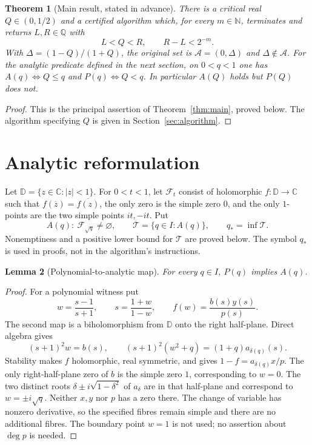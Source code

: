\documentclass[11pt,a4paper]{article}
\newtheorem{theorem}{Theorem}[section]
\newtheorem{lemma}[theorem]{Lemma}
\theoremstyle{definition}\newtheorem{definition}[theorem]{Definition}
\theoremstyle{remark}\newtheorem{remark}[theorem]{Remark}
\newcommand{\D}{\mathbb D}\newcommand{\R}{\mathbb R}
\newcommand{\C}{\mathbb C}\newcommand{\Qrat}{\mathbb Q}
\newcommand{\Adm}{\mathcal A}\newcommand{\F}{\mathcal F}
\newcommand{\T}{\mathcal T}\newcommand{\Kc}{\mathcal K}
\begin{document}
\begin{theorem}[Main result, stated in advance]\label{thm:front}
There is a critical real $Q\in(0,1/2)$ and a certified algorithm which, for every
$m\in\mathbb N$, terminates and returns $L,R\in\Qrat$ with
\[
 L<Q<R,\qquad R-L<2^{-m}.
\]
With $\Delta=(1-Q)/(1+Q)$, the original set is $\Adm=(0,\Delta)$ and
$\Delta\notin\Adm$. For the analytic predicate defined in the next section,
on $0<q<1$ one has $A(q)\Longleftrightarrow Q\le q$ and
$P(q)\Longleftrightarrow Q<q$. In particular $A(Q)$ holds but $P(Q)$ does not.
\end{theorem}
\begin{proof}
This is the principal assertion of Theorem~\ref{thm:main}, proved below.
The algorithm specifying $Q$ is given in Section~\ref{sec:algorithm}.
\end{proof}

\section{Analytic reformulation}\label{sec:analytic}
Let $\D=\{z\in\C:|z|<1\}$. For $0<t<1$, let $\F_t$ consist of
holomorphic $f:\D\to\C$ such that $f(\overline z)=\overline{f(z)}$,
the only zero is the simple zero $0$, and the only $1$-points are
the two simple points $it,-it$. Put
\[
 A(q):\ \F_{\sqrt q}\ne\varnothing,\qquad
 \T=\{q\in I:A(q)\},\qquad q_* =\inf\T.
\]
Nonemptiness and a positive lower bound for $\T$ are proved below.
The symbol $q_*$ is used in proofs, not in the algorithm's instructions.

\begin{lemma}[Polynomial-to-analytic map]\label{lem:forward}
For every $q\in I$, $P(q)$ implies $A(q)$.
\end{lemma}
\begin{proof}
For a polynomial witness put
\[
 w=\frac{s-1}{s+1},\qquad s=\frac{1+w}{1-w},\qquad
 f(w)=\frac{b(s)y(s)}{p(s)}.
\]
The second map is a biholomorphism from $\D$ onto the right half-plane.
Direct algebra gives
\begin{equation}\label{eq:cayley}
 (s+1)^2w=b(s),\qquad
 (s+1)^2(w^2+q)=(1+q)a_{\delta(q)}(s).
\end{equation}
Stability makes $f$ holomorphic, real symmetric, and gives
$1-f=a_{\delta(q)}x/p$. The only right-half-plane zero of $b$ is the
simple zero $1$, corresponding to $w=0$. The two distinct roots
$\delta\pm i\sqrt{1-\delta^2}$ of $a_\delta$ are in that half-plane
and correspond to $w=\pm i\sqrt q$. Neither $x,y$ nor $p$ has a zero
there. The change of variable has nonzero derivative, so the specified
fibres remain simple and there are no additional fibres. The boundary
point $w=1$ is not used; no assertion about $\deg p$ is needed.
\end{proof}
\end{document}

